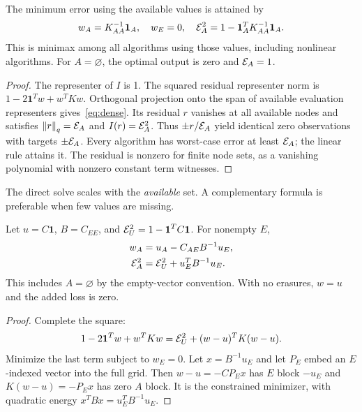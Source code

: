 \documentclass[final,leqno,letterpaper]{etna}
\newcommand{\one}{\boldsymbol 1}\newcommand{\norm}[1]{\left\lVert#1\right\rVert}
\begin{document}
\begin{proposition}\label{prop:optimal}
The minimum error using the available values is attained by
\begin{equation}
w_A=K_{AA}^{-1}\one_A,\quad w_E=0,\quad
\E_A^2=1-\one_A^TK_{AA}^{-1}\one_A.
\label{eq:dense}
\end{equation}
This is minimax among all algorithms using those values, including nonlinear algorithms. For $A=\varnothing$, the optimal output is zero and $\mathcal E_A=1$.
\end{proposition}
\begin{proof}
The representer of $I$ is 1. The squared residual representer norm is $1-2\one^Tw+w^TKw$. Orthogonal projection onto the span of available evaluation representers gives~\eqref{eq:dense}. Its residual $r$ vanishes at all available nodes and satisfies $\norm r_q=\E_A$ and $I(r)=\mathcal E_A^2$. Thus $\pm r/\mathcal E_A$ yield identical zero observations with targets $\pm\mathcal E_A$. Every algorithm has worst-case error at least $\mathcal E_A$; the linear rule attains it. The residual is nonzero for finite node sets, as a vanishing polynomial with nonzero constant term witnesses.
\end{proof}

The direct solve scales with the \emph{available} set. A complementary formula is preferable when few values are missing.

\begin{theorem}\label{thm:erasure}
Let $u=C\one$, $B=C_{EE}$, and $\E_U^2=1-\one^TC\one$. For nonempty $E$,
\begin{align}
w_A&=u_A-C_{AE}B^{-1}u_E,\label{eq:weights}\\
\mathcal E_A^2&=\mathcal E_U^2+u_E^TB^{-1}u_E.\label{eq:loss}
\end{align}
This includes $A=\varnothing$ by the empty-vector convention. With no erasures, $w=u$ and the added loss is zero.
\end{theorem}
\begin{proof}
Complete the square:
\[
1-2\one^Tw+w^TKw=\E_U^2+(w-u)^TK(w-u).
\]
Minimize the last term subject to $w_E=0$. Let $x=B^{-1}u_E$ and let $P_E$ embed an $E$-indexed vector into the full grid. Then $w-u=-CP_Ex$ has $E$ block $-u_E$ and $K(w-u)=-P_Ex$ has zero $A$ block. It is the constrained minimizer, with quadratic energy $x^TBx=u_E^TB^{-1}u_E$.
\end{proof}

\FloatBarrier
\end{document}
